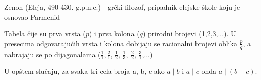 \documentclass[a4paper]{article}
\begin{document}
\appendix

\renewcommand{\refname}{Literatura}
\begin{thebibliography}{9}


\end{thebibliography}


\renewcommand{\refname}{Dodatak: objašnjenja}
\begin{thebibliography}{9}

 Zenon (Eleja, 490-430. g.p.n.e.) - grčki filozof, pripadnik elejske škole koju je osnovao Parmenid

 Tabela čije su prva vrsta ($p$) i prva kolona ($q$) prirodni brojevi (1,2,3,...). U presecima odgovarajućih vrsta i kolona dobijaju se racionalni brojevi oblika $\frac{p}{q}$, a nabrajaju se po dijagonalama ($\frac{1}{1}, \frac{2}{1}$, $\frac{1}{2}$, $\frac{1}{3}$, $\frac{2}{2}$, $\frac{3}{1}$,...)

U opštem slučaju, za svaka tri cela broja a, b, c ako $a \mid b$ i $a \mid c$ onda $a \mid (b - c)$.




\end{thebibliography}
\end{document}
